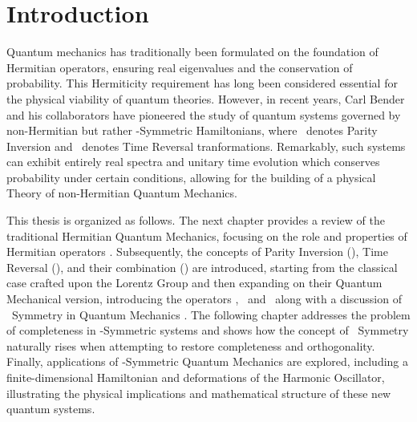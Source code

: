 \chapter{Introduction}\label{ch:introduction}
    Quantum mechanics has traditionally been formulated on the foundation of Hermitian operators, ensuring real eigenvalues and the conservation of probability. This Hermiticity requirement has long been considered essential for the physical viability of quantum theories. However, in recent years, Carl Bender and his collaborators have pioneered the study of quantum systems governed by non-Hermitian but rather \PT-Symmetric Hamiltonians, where \mcP\ denotes Parity Inversion and \mcT\ denotes Time Reversal tranformations. Remarkably, such systems can exhibit entirely real spectra and unitary time evolution which conserves probability under certain conditions, allowing for the building of a physical Theory of non-Hermitian Quantum Mechanics.

    This thesis is organized as follows. The next chapter provides a review of the traditional Hermitian Quantum Mechanics, focusing on the role and properties of Hermitian operators \cite{Shankar2012-kg,Sakurai2020-pu,Bernardini1993-iy}. Subsequently, the concepts of Parity Inversion (\mcP), Time Reversal (\mcT), and their combination (\PT) are introduced, starting from the classical case crafted upon the Lorentz Group \cite{bender2024} and then expanding on their Quantum Mechanical version, introducing the operators \hP, \hT\ and \hPT\ along with a discussion of \PT\ Symmetry in Quantum Mechanics \cite{Bender2005,bender2024}. The following chapter addresses the problem of completeness in \PT-Symmetric systems and shows how the concept of \CPT\ Symmetry naturally rises when attempting to restore completeness and orthogonality. Finally, applications of \PT-Symmetric Quantum Mechanics are explored, including a finite-dimensional Hamiltonian and deformations of the Harmonic Oscillator, illustrating the physical implications and mathematical structure of these new quantum systems.